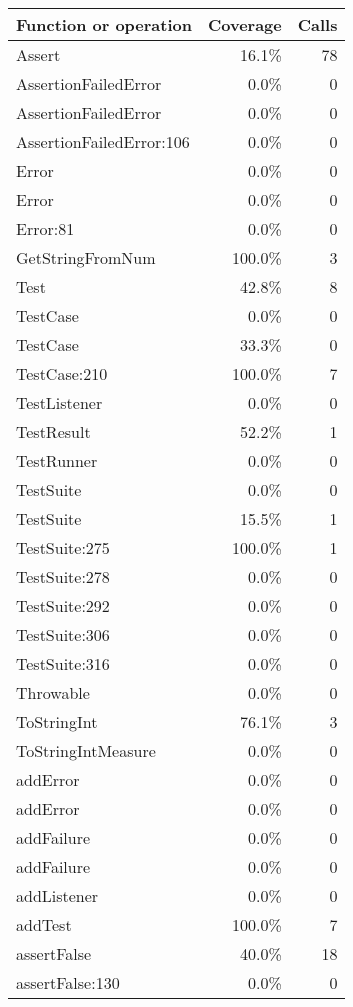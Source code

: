 \documentclass[a4paper]{article}
\begin{document}
\bigskip
\begin{longtable}{|l|r|r|}
\hline
Function or operation & Coverage & Calls \\
\hline
\hline
Assert & 16.1\% & 78 \\
\hline
AssertionFailedError & 0.0\% & 0 \\
\hline
AssertionFailedError & 0.0\% & 0 \\
\hline
AssertionFailedError:106 & 0.0\% & 0 \\
\hline
Error & 0.0\% & 0 \\
\hline
Error & 0.0\% & 0 \\
\hline
Error:81 & 0.0\% & 0 \\
\hline
GetStringFromNum & 100.0\% & 3 \\
\hline
Test & 42.8\% & 8 \\
\hline
TestCase & 0.0\% & 0 \\
\hline
TestCase & 33.3\% & 0 \\
\hline
TestCase:210 & 100.0\% & 7 \\
\hline
TestListener & 0.0\% & 0 \\
\hline
TestResult & 52.2\% & 1 \\
\hline
TestRunner & 0.0\% & 0 \\
\hline
TestSuite & 0.0\% & 0 \\
\hline
TestSuite & 15.5\% & 1 \\
\hline
TestSuite:275 & 100.0\% & 1 \\
\hline
TestSuite:278 & 0.0\% & 0 \\
\hline
TestSuite:292 & 0.0\% & 0 \\
\hline
TestSuite:306 & 0.0\% & 0 \\
\hline
TestSuite:316 & 0.0\% & 0 \\
\hline
Throwable & 0.0\% & 0 \\
\hline
ToStringInt & 76.1\% & 3 \\
\hline
ToStringIntMeasure & 0.0\% & 0 \\
\hline
addError & 0.0\% & 0 \\
\hline
addError & 0.0\% & 0 \\
\hline
addFailure & 0.0\% & 0 \\
\hline
addFailure & 0.0\% & 0 \\
\hline
addListener & 0.0\% & 0 \\
\hline
addTest & 100.0\% & 7 \\
\hline
assertFalse & 40.0\% & 18 \\
\hline
assertFalse:130 & 0.0\% & 0 \\

\end{longtable}
\end{document}
